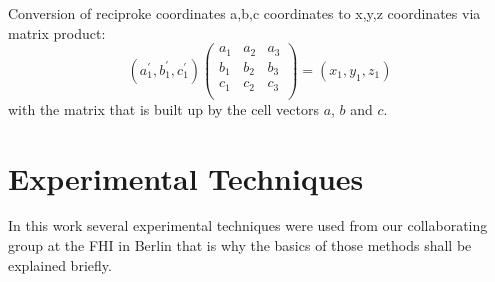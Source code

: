 \documentclass[11pt,DIV=13,BCOR=5mm,a4paper,headinclude]{scrbook}
\begin{document}
\appendix

\captionsetup{labelformat=myformat}
\def\thefigure{A.\arabic{figure}}
\def\thetable{A.\arabic{table}}

Conversion of reciproke coordinates a,b,c coordinates to x,y,z coordinates via matrix product:
\begin{equation*}
  (a_1^\prime, b_1^\prime, c_1^\prime) \left( \begin{array}{ccc}
                   a_1 & a_2 & a_3 \\
                   b_1 & b_2 & b_3 \\
                   c_1 & c_2 & c_3 \\
               \end{array} \right ) =(x_1, y_1, z_1)
\end{equation*}
with the matrix that is built up by the cell vectors $a$, $b$ and $c$.

\section{Experimental Techniques}\label{exp_techniques}
In this work several experimental techniques were used from our collaborating group at the FHI in Berlin that is why the basics of those methods shall be explained briefly.
\end{document}
